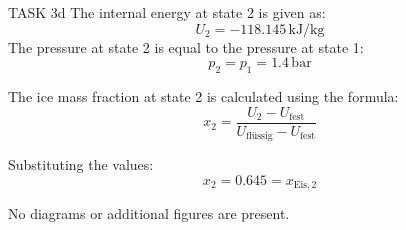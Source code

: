 TASK 3d  
The internal energy at state 2 is given as:  
\[
U_2 = -118.145 \, \text{kJ/kg}
\]  
The pressure at state 2 is equal to the pressure at state 1:  
\[
p_2 = p_1 = 1.4 \, \text{bar}
\]  

The ice mass fraction at state 2 is calculated using the formula:  
\[
x_2 = \frac{U_2 - U_{\text{fest}}}{U_{\text{flüssig}} - U_{\text{fest}}}
\]  

Substituting the values:  
\[
x_2 = 0.645 = x_{\text{Eis},2}
\]  

No diagrams or additional figures are present.